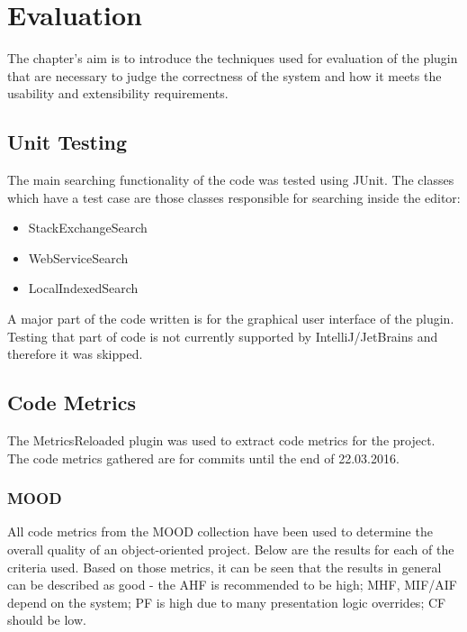 \documentclass{l4proj}
\begin{document}
\chapter{Evaluation}

The chapter's aim is to introduce the techniques used for evaluation of the plugin that are necessary to judge the correctness of the system and how it meets the usability and extensibility requirements.

\section{Unit Testing}
The main searching functionality of the code was tested using JUnit. The classes which have a test case are those classes responsible for searching inside the editor:

\begin{itemize}
\item StackExchangeSearch
\item WebServiceSearch
\item LocalIndexedSearch
\end{itemize}

\noindent
A major part of the code written is for the graphical user interface of the plugin. Testing that part of code is not currently supported by IntelliJ/JetBrains and therefore it was skipped. 

\section{Code Metrics}

The MetricsReloaded plugin \cite{metricsreloaded} was used to extract code metrics for the project. The code metrics gathered are for commits until the end of 22.03.2016.

\subsection{MOOD}

All code metrics from the MOOD collection \cite{mood} have been used to determine the overall quality of an object-oriented project. Below are the results for each of the criteria used. Based on those metrics, it can be seen that the results in general can be described as good - the AHF is recommended to be high; MHF, MIF/AIF depend on the system; PF is high due to many presentation logic overrides; CF should be low.
\end{document}
